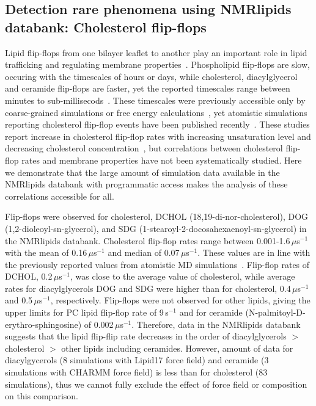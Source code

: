 \documentclass[fleqn,10pt]{wlscirep}
\begin{document}
\subsection{Detection rare phenomena using NMRlipids databank: Cholesterol flip-flops}
Lipid flip-flops from one bilayer leaflet to another play an important role in lipid trafficking and regulating membrane properties~\cite{vanmeer08}. Phospholipid flip-flops are slow, occuring with the timescales of hours or days, while cholesterol, diacylglycerol and ceramide flip-flops are faster, yet the reported timescales range between minutes to sub-millisecods~\cite{vanmeer08,steck12,parisio16,gu19}. These timescales were previously accessible only by coarse-grained simulations or free energy calculations~\cite{parisio16}, yet atomistic simulations reporting cholesterol flip-flop events have been published recently~\cite{gu19,javanainen19,baral20}. 
These studies report increase in cholesterol flip-flop rates with increasing unsaturation level and decreasing cholesterol concentration~\cite{gu19,javanainen19}, but correlations between cholesterol flip-flop rates and membrane properties have not been systematically studied. Here we demonstrate that the large amount of simulation data available in the NMRlipids databank with programmatic access makes the analysis of these correlations accessible for all.


Flip-flops were observed for cholesterol, %
DCHOL (18,19-di-nor-cholesterol), %
DOG (1,2-dioleoyl-sn-glycerol), %
and SDG (1-stearoyl-2-docosahexaenoyl-sn-glycerol) in the NMRlipids databank. Cholesterol flip-flop rates range between 0.001-1.6\,$\mu$s$^{-1}$ with the mean of 0.16\,$\mu$s$^{-1}$ and median of 0.07\,$\mu$s$^{-1}$. These values are in line with the previously reported values from atomistic MD simulations~\cite{gu19,javanainen19,baral20}. Flip-flop rates of DCHOL, 0.2\,$\mu$s$^{-1}$, was close to the average value of cholesterol, while average rates for diacylglycerols DOG and SDG were higher than for cholesterol, 0.4\,$\mu$s$^{-1}$ and 0.5\,$\mu$s$^{-1}$, respectively. Flip-flops were not observed for other lipids, giving the upper limits for PC lipid flip-flop rate of 9\,s$^{-1}$ and for ceramide (N-palmitoyl-D-erythro-sphingosine) of 0.002\,$\mu$s$^{-1}$. Therefore, data in the NMRlipids databank suggests that the lipid flip-flip rate decreases in the order of diacylglycerols $>$ cholesterol $>$ other lipids including ceramides. However, amount of data for diacylgycerols (8 simulations with Lipid17 force field) and ceramide (3 simulations with CHARMM force field) is less than for cholesterol (83 simulations), thus we cannot fully exclude the effect of force field or composition on this comparison.
\end{document}

